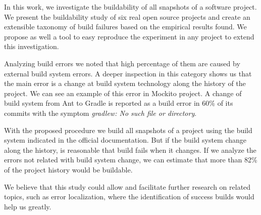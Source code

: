 In this work, we investigate the buildability of all snapshots of a software project. We present the buildability study of six real open source projects and create an extensible taxonomy of build failures based on the empirical results found. We propose as well a tool to easy reproduce the experiment in any project to extend this investigation.


Analyzing build errors we noted that high percentage of them are caused by external build system errors. A deeper inspection in this category shows us that the main error is a change at build system technology along the history of the project. We can see an example of this error in Mockito project. A change of build system from Ant to Gradle is reported as a build error in 60\% of its commits with the symptom \textit{gradlew: No such file or directory}.

With the proposed procedure we build all snapshots of a project using the build system indicated in the official documentation.
But if the build system change along the history, is reasonable that build fails when it changes.
If we analyze the errors not related with build system change, we can estimate that more than 82\% of the project history would be buildable.

We believe that this study could allow and facilitate further research on related topics, such as error localization, where the identification of success builds would help us greatly.  